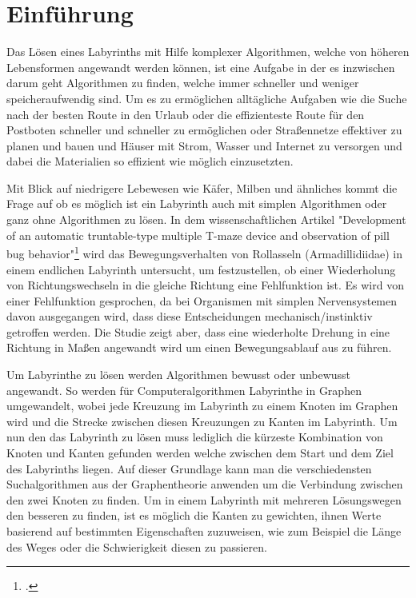 \documentclass[12pt, a4paper, titlepage]{article}
\begin{document}

\tableofcontents

\newpage

\section{Einführung}

Das Lösen eines Labyrinths mit Hilfe komplexer Algorithmen, welche von höheren Lebensformen angewandt werden können, ist eine Aufgabe in der es inzwischen darum geht Algorithmen zu finden, welche immer schneller und weniger speicheraufwendig sind.
Um es zu ermöglichen alltägliche Aufgaben wie die Suche nach der besten Route in den Urlaub oder die effizienteste Route für den Postboten schneller und schneller zu ermöglichen oder Straßennetze effektiver zu planen und bauen und Häuser mit Strom, Wasser und Internet zu versorgen und dabei die Materialien so effizient wie möglich einzusetzten.


\bigskip

Mit Blick auf niedrigere Lebewesen wie Käfer, Milben und ähnliches kommt die Frage auf ob es möglich ist ein Labyrinth auch mit simplen Algorithmen oder ganz ohne Algorithmen zu lösen.
In dem wissenschaftlichen Artikel "Development of an automatic truntable-type multiple T-maze device and observation of pill bug behavior"\footcite{bug} wird das Bewegungsverhalten von Rollasseln (Armadillidiidae) in einem endlichen Labyrinth untersucht, um festzustellen, ob einer Wiederholung von Richtungswechseln in die gleiche Richtung eine Fehlfunktion ist.
Es wird von einer Fehlfunktion gesprochen, da bei Organismen mit simplen Nervensystemen davon ausgegangen wird, dass diese Entscheidungen mechanisch/instinktiv getroffen werden.
Die Studie zeigt aber, dass eine wiederholte Drehung in eine Richtung in Maßen angewandt wird um einen Bewegungsablauf aus zu führen.

\bigskip

Um Labyrinthe zu lösen werden Algorithmen bewusst oder unbewusst angewandt.
So werden für Computeralgorithmen Labyrinthe in Graphen umgewandelt, wobei jede Kreuzung im Labyrinth zu einem Knoten im Graphen wird und die Strecke zwischen diesen Kreuzungen zu Kanten im Labyrinth.
Um nun den das Labyrinth zu lösen muss lediglich die kürzeste Kombination von Knoten und Kanten gefunden werden welche zwischen dem Start und dem Ziel des Labyrinths liegen.
Auf dieser Grundlage kann man die verschiedensten Suchalgorithmen aus der Graphentheorie anwenden um die Verbindung zwischen den zwei Knoten zu finden.
Um in einem Labyrinth mit mehreren Lösungswegen den besseren zu finden, ist es möglich die Kanten zu gewichten, ihnen Werte basierend auf bestimmten Eigenschaften zuzuweisen, wie zum Beispiel die Länge des Weges oder die Schwierigkeit diesen zu passieren.
\end{document}
